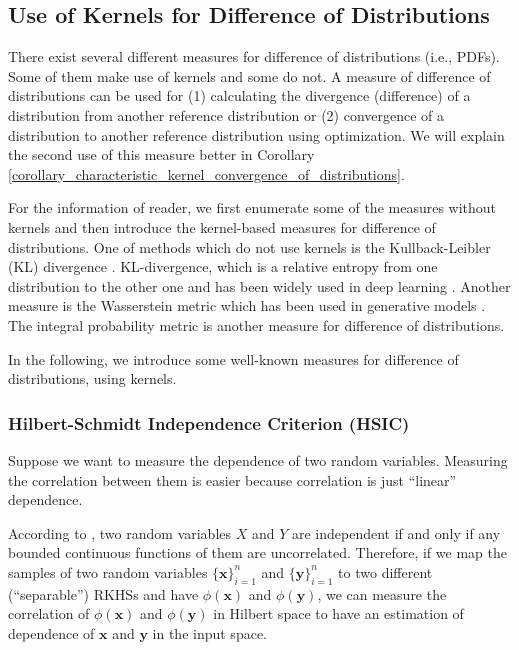 \documentclass[lang=cn,10pt]{gorgeousnbook}
\numberwithin{equation}{section}%
\numberwithin{figure}{section}%
\begin{document}
\subsection{Use of Kernels for Difference of Distributions}

There exist several different measures for difference of distributions (i.e., PDFs). Some of them make use of kernels and some do not. 
A measure of difference of distributions can be used for (1) calculating the divergence (difference) of a distribution from another reference distribution or (2) convergence of a distribution to another reference distribution using optimization. We will explain the second use of this measure better in Corollary \ref{corollary_characteristic_kernel_convergence_of_distributions}.

For the information of reader, we first enumerate some of the measures without kernels and then introduce the kernel-based measures for difference of distributions. 
One of methods which do not use kernels is the Kullback-Leibler (KL) divergence \cite{kullback1951information}. KL-divergence, which is a relative entropy from one distribution to the other one and has been widely used in deep learning \cite{goodfellow2016deep}.
Another measure is the Wasserstein metric which has been used in generative models \cite{arjovsky2017wasserstein}. 
The integral probability metric \cite{muller1997integral} is another measure for difference of distributions. 

In the following, we introduce some well-known measures for difference of distributions, using kernels. 

\subsubsection{Hilbert-Schmidt Independence Criterion (HSIC)}

Suppose we want to measure the dependence of two random variables. Measuring the correlation between them is easier because correlation is just ``linear'' dependence. 

According to \cite{hein2004kernels}, two random variables $X$ and $Y$ are independent if and only if any bounded continuous functions of them are uncorrelated. Therefore, if we map the samples of two random variables $\{\boldsymbol{x}\}_{i=1}^n$ and $\{\boldsymbol{y}\}_{i=1}^n$ to two different (``separable'') RKHSs and have $\phi(\boldsymbol{x})$ and $\phi(\boldsymbol{y})$, we can measure the correlation of $\phi(\boldsymbol{x})$ and $\phi(\boldsymbol{y})$ in Hilbert space to have an estimation of dependence of $\boldsymbol{x}$ and $\boldsymbol{y}$ in the input space. 
\end{document}
